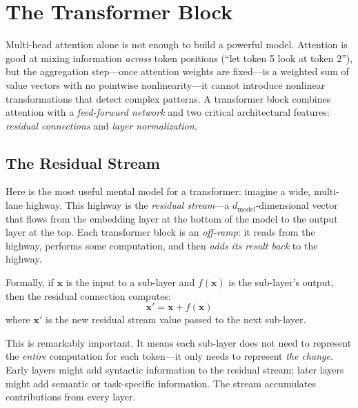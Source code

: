
\section{The Transformer Block}
\label{sec:transformer-block}

Multi-head attention alone is not enough to build a powerful model. Attention is good at mixing information \emph{across} token positions (``let token 5 look at token 2''), but the aggregation step---once attention weights are fixed---is a weighted sum of value vectors with no pointwise nonlinearity---it cannot introduce nonlinear transformations that detect complex patterns. A transformer block combines attention with a \emph{feed-forward network} and two critical architectural features: \emph{residual connections} and \emph{layer normalization}.

\subsection{The Residual Stream}
\label{sec:residual-stream}

%
Here is the most useful mental model for a transformer: imagine a wide, multi-lane highway. This highway is the \emph{residual stream}---a $d_{\text{model}}$-dimensional vector that flows from the embedding layer at the bottom of the model to the output layer at the top. Each transformer block is an \emph{off-ramp}: it reads from the highway, performs some computation, and then \emph{adds its result back} to the highway.

Formally, if $\mathbf{x}$ is the input to a sub-layer and $f(\mathbf{x})$ is the sub-layer's output, then the residual connection computes:
\begin{equation}
\label{eq:residual}
\mathbf{x}' = \mathbf{x} + f(\mathbf{x})
\end{equation}
where $\mathbf{x}'$ is the new residual stream value passed to the next sub-layer.

This is remarkably important. It means each sub-layer does not need to represent the \emph{entire} computation for each token---it only needs to represent \emph{the change}. Early layers might add syntactic information to the residual stream; later layers might add semantic or task-specific information. The stream accumulates contributions from every layer.

